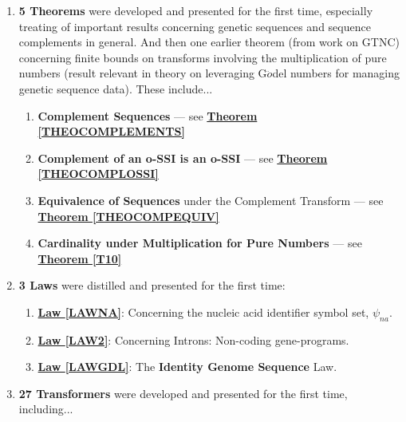 \documentclass[a4paper, 18pt]{book} %
\begin{document}
\begin{enumerate}
{}
\item{ \textbf{5 Theorems} were developed and presented for the first time, especially treating of important results concerning genetic sequences and sequence complements in general. And then one earlier theorem (from work on GTNC\cite{Lutalo2024gtnc}) concerning finite bounds on transforms involving the multiplication of pure numbers (result relevant in theory on leveraging G$\ddot{o}$del numbers for managing genetic sequence data). These include...

	\begin{enumerate}
	\item \textbf{Complement Sequences} --- see  \textbf{\hyperref[THEOCOMPLEMENTS]{Theorem \ref{THEOCOMPLEMENTS}}}
	\item \textbf{Complement of an o-SSI is an o-SSI} --- see  \textbf{\hyperref[THEOCOMPLOSSI]{Theorem \ref{THEOCOMPLOSSI}}} 
	\item \textbf{Equivalence of Sequences} under the Complement Transform  --- see  \textbf{\hyperref[THEOCOMPEQUIV]{Theorem \ref{THEOCOMPEQUIV}}} 
	\item \textbf{Cardinality under Multiplication for Pure Numbers}  --- see  \textbf{\hyperref[T10]{Theorem \ref{T10}}} 
	\end{enumerate}
}
\item {\textbf{3 Laws} were distilled and presented for the first time:
	\begin{enumerate}
	\item \textbf{\hyperref[LAWNA]{Law \ref{LAWNA}}}: Concerning the nucleic acid identifier symbol set, $\psi_{na}$. 
	\item \textbf{\hyperref[LAW2]{Law \ref{LAW2}}}: Concerning Introns: Non-coding gene-programs.
	\item \textbf{\hyperref[LAWGDL]{Law \ref{LAWGDL}}}: The \textbf{Identity Genome Sequence} Law.
	\end{enumerate}
}
\item{ \textbf{27 Transformers} were developed and presented for the first time, including...

}
\end{enumerate}
\end{document}
